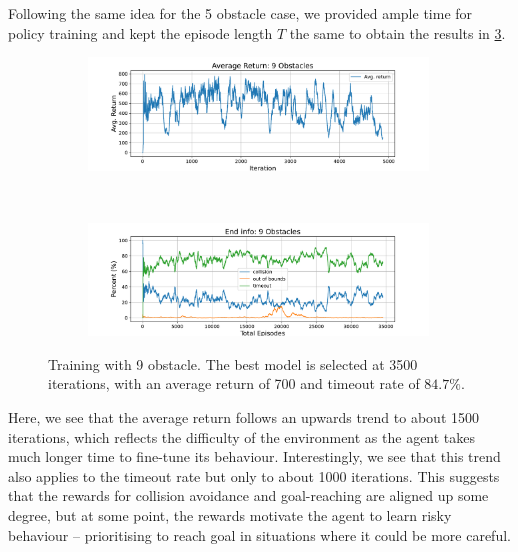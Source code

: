 Following the same idea for the 5 obstacle case, we provided ample time for policy training and kept the episode length $T$ the same to obtain the results in  \cref{fig:7_train_nav_9_obst}.
\begin{figure}[htb]
    \centering
    \begin{subfigure}[b]{\textwidth}
        \centering
        \captionsetup{justification=centering}
        \includegraphics[width=0.99\textwidth]{figures/7_/3DCarModel_BodyObs_NavSetup_9_NewObs_EnvSpace10_last3150_v1_reward.pdf}
        \label{fig:9_obst_nav_rew}
    \end{subfigure} \\
    \begin{subfigure}[b]{\textwidth}
        \centering
        \captionsetup{justification=centering}
        \includegraphics[width=0.99\textwidth]{figures/7_/3DCarModel_BodyObs_NavSetup_9_NewObs_EnvSpace10_last3150_v1_end_info.pdf}
        \label{fig:9_obst_nav_end}
    \end{subfigure} 
    \caption{Training with 9 obstacle. The best model is selected at 3500 iterations, with an average return of 700 and timeout rate of $84.7\%$. }
    \label{fig:7_train_nav_9_obst}
\end{figure}
Here, we see that the average return follows an upwards trend to about 1500 iterations, which reflects the difficulty of the environment as the agent takes much longer time to fine-tune its behaviour. Interestingly, we see that this trend also applies to the timeout rate but only to about 1000 iterations. This suggests that the rewards for collision avoidance and goal-reaching are aligned up some degree, but at some point, the rewards motivate the agent to learn risky behaviour -- prioritising to reach goal in situations where it could be more careful.

